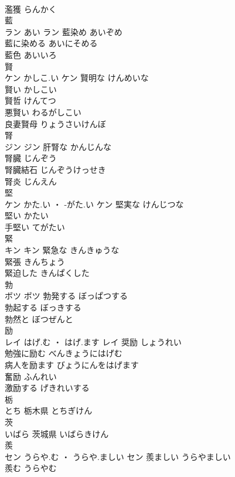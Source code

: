 \documentclass[8pt]{extreport}
\begin{document}
\begin{CJK}{UTF8}{min}
\\	濫獲	らんかく	
\\	藍	
\\	ラン	あい	ラン	藍染め	あいぞめ	
\\	藍に染める	あいにそめる	
\\	藍色	あいいろ	
\\	賢	
\\	ケン	かしこ.い	ケン	賢明な	けんめいな	
\\	賢い	かしこい	
\\	賢哲	けんてつ	
\\	悪賢い	わるがしこい	
\\	良妻賢母	りょうさいけんぼ	
\\	腎	
\\	ジン		ジン	肝腎な	かんじんな	
\\	腎臓	じんぞう	
\\	腎臓結石	じんぞうけっせき	
\\	腎炎	じんえん	
\\	堅	
\\	ケン	かた.い ・ -がた.い	ケン	堅実な	けんじつな	
\\	堅い	かたい	
\\	手堅い	てがたい	
\\	緊	
\\	キン		キン	緊急な	きんきゅうな	
\\	緊張	きんちょう	
\\	緊迫した	きんぱくした	
\\	勃	
\\	ボツ		ボツ	勃発する	ぼっぱつする	
\\	勃起する	ぼっきする	
\\	勃然と	ぼつぜんと	
\\	励	
\\	レイ	はげ.む ・ はげ.ます	レイ	奨励	しょうれい	
\\	勉強に励む	べんきょうにはげむ	
\\	病人を励ます	びょうにんをはげます	
\\	奮励	ふんれい	
\\	激励する	げきれいする	
\\	栃	
\\	とち														栃木県	とちぎけん	
\\	茨	
\\	いばら														茨城県	いばらきけん	
\\	羨	
\\	セン	うらや.む ・ うらや.ましい	セン	羨ましい	うらやましい	
\\	羨む	うらやむ	

\end{CJK}
\end{document}
